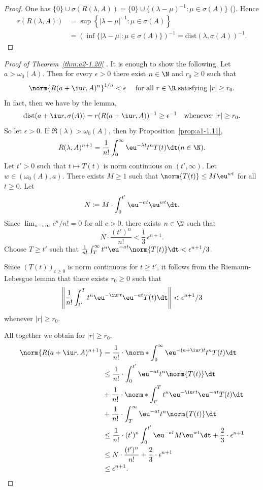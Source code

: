 \begin{proof}
One has $\{0\} \cup \sigma(R(\lambda,A)) = \{0\} \cup \{(\lambda-\mu)^{-1} \colon \mu \in \sigma(A)\}$ (\textcite[Lemma~ 2.11]{davies:1980}).
Hence 
\begin{align*}
r(R(\lambda,A)) &= \sup \left\{|\lambda-\mu|^{-1} \colon \mu \in \sigma(A)\right\} \\
& = 
\left(\inf \{|\lambda-\mu| \colon \mu \in \sigma(A)\}\right)^{-1} = \text{dist}(\lambda,\sigma(A))^{-1}.
\end{align*}
\end{proof}
\begin{proof}[Proof of Theorem~\ref{thm:a2-1.20}  ]
It is enough to show the following.
Let $a > \omega_{0}(A)$.
Then for every $\epsilon > 0$ there exist $n \in \N$ and $r_0 \geq 0$ such that
\[
\norm{R(a+ \iu r,A)^n}^{1/n} < \epsilon \quad  \text{ for all } r \in \R \text{ satisfying $|r| \geq r_{0}$.}
\]
In fact, then we have by the lemma, 
\[
\text{dist}(a+\iu r,\sigma(A)) = r(R(a+ \iu r,A))^{-1} \geq \epsilon^{-1} \quad \text{whenever $|r| \geq r_{0}$.}
\]
So let $\epsilon > 0$.
If\/ $\Re(\lambda) > \omega_{0}(A)$, then by Proposition~\ref{prop:a1-1.11},
\[
R(\lambda,A)^{n+1} = \frac{1}{n!}\int_0^\infty \eu^{-\lambda t}t^nT(t) \dt (n \in \N).
\]
Let $t' > 0$ such that $t \mapsto T(t)$ is norm continuous on $(t',\infty)$.
Let $w \in (\omega_{0}(A),a)$.
There exists $M \geq 1$ such that $\norm{T(t)} \leq M\eu^{wt}$ for all $t \geq 0$.
Let 
\[
N \coloneqq M\cdot\int_{0}^{t'} \eu^{-at}\eu^{wt} \dt.
\]
Since $\lim_{n\to\infty} c^n/n! = 0$ for all $c > 0$, there exists $n \in \N$ such that 
%
\[
	N\cdot \frac{(t')^n}{n!} < \frac{1}{3}\,\epsilon^{n+1}.
\]
%
Choose $T \geq t'$ such that $\frac{1}{n!}\int_{T}^{\infty} t^n\eu^{-at}\norm{T(t)} \dt < \epsilon^{n+1}/3$.

Since $(T(t))_{t\geq 0}$ is norm continuous for $t \geq t'$, it follows from the Riemann-Lebesgue lemma that there exists $r_{0} \geq 0$ such that 
\[
\left\lVert \frac{1}{n!}\int_{t'}^T t^{n}\eu^{-\iu rt}\eu^{-at}T(t) \dt \right\lVert  < \epsilon^{n+1}/3
\]
 whenever $|r| \geq r_{0}$.

All together we obtain for $|r| \geq r_{0}$,
\begin{align*}
    \norm{R(a + \iu r,A)^{n+1}} & = \frac{1}{n!}\cdot 
    	\norm*{\int_0^\infty \eu^{-(a + \iu r)t}t^nT(t) \dt } \\
    & \leq \frac{1}{n!}\cdot\int_{0}^{t'} \eu^{-at}t^n\norm{T(t)} \dt \\
    & + \frac{1}{n!}\cdot \norm*{\int_{t'}^T t^n\eu^{-\iu rt}\eu^{-at}T(t) \dt } \\
    & + \frac{1}{n!}\cdot\int_T^\infty \eu^{-at}t^n\norm{T(t)} \dt \\
    & \leq \frac{1}{n!}\cdot(t')^{n}\int_{0}^{t'} \eu^{-at}M\eu^{wt} \dt + \frac{2}{3}\cdot\epsilon^{n+1} \\
    & \leq N\cdot \frac{(t')^n}{n!} + \frac{2}{3}\cdot\epsilon^{n+1} \\
    & \leq \epsilon^{n+1}.
\end{align*}
\end{proof}
